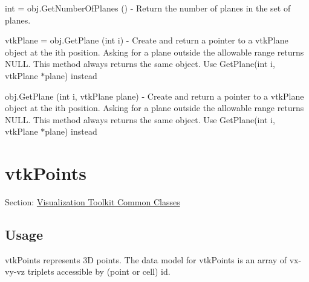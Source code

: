 \begin{DoxyItemize}
\item {\ttfamily int = obj.\-Get\-Number\-Of\-Planes ()} -\/ Return the number of planes in the set of planes.  
\item {\ttfamily vtk\-Plane = obj.\-Get\-Plane (int i)} -\/ Create and return a pointer to a vtk\-Plane object at the ith position. Asking for a plane outside the allowable range returns N\-U\-L\-L. This method always returns the same object. Use Get\-Plane(int i, vtk\-Plane $\ast$plane) instead  
\item {\ttfamily obj.\-Get\-Plane (int i, vtk\-Plane plane)} -\/ Create and return a pointer to a vtk\-Plane object at the ith position. Asking for a plane outside the allowable range returns N\-U\-L\-L. This method always returns the same object. Use Get\-Plane(int i, vtk\-Plane $\ast$plane) instead  
\end{DoxyItemize}\hypertarget{vtkcommon_vtkpoints}{}\section{vtk\-Points}\label{vtkcommon_vtkpoints}
Section\-: \hyperlink{sec_vtkcommon}{Visualization Toolkit Common Classes} \hypertarget{vtkwidgets_vtkxyplotwidget_Usage}{}\subsection{Usage}\label{vtkwidgets_vtkxyplotwidget_Usage}
vtk\-Points represents 3\-D points. The data model for vtk\-Points is an array of vx-\/vy-\/vz triplets accessible by (point or cell) id.

